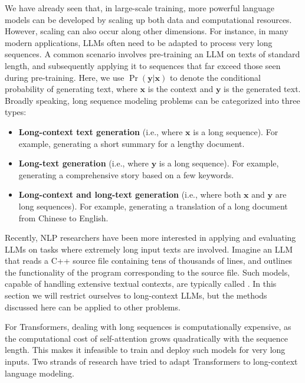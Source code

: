 \noindent We have already seen that, in large-scale training, more powerful language models can be developed by scaling up both data and computational resources. However, scaling can also occur along other dimensions. For instance, in many modern applications, LLMs often need to be adapted to process very long sequences. A common scenario involves pre-training an LLM on texts of standard length, and subsequently applying it to sequences that far exceed those seen during pre-training. Here, we use $\Pr(\mathbf{y}|\mathbf{x})$ to denote the conditional probability of generating text, where $\mathbf{x}$ is the context and $\mathbf{y}$ is the generated text. Broadly speaking, long sequence modeling problems can be categorized into three types:

\begin{itemize}
\item \vspace{0.5em} \textbf{Long-context text generation} (i.e., where $\mathbf{x}$ is a long sequence). For example, generating a short summary for a lengthy document.
\item \vspace{0.3em} \textbf{Long-text generation} (i.e., where $\mathbf{y}$ is a long sequence). For example, generating a comprehensive story based on a few keywords.
\item \vspace{0.3em} \textbf{Long-context and long-text generation} (i.e., where both $\mathbf{x}$ and $\mathbf{y}$ are long sequences). For example, generating a translation of a long document from Chinese to English.
\end{itemize}
\vspace{0.5em}

Recently, NLP researchers have been more interested in applying and evaluating LLMs on tasks where extremely long input texts are involved. Imagine an LLM that reads a C++ source file containing tens of thousands of lines, and outlines the functionality of the program corresponding to the source file. Such models, capable of handling extensive textual contexts, are typically called . In this section we will restrict ourselves to long-context LLMs, but the methods discussed here can be applied to other problems.

For Transformers, dealing with long sequences is computationally expensive, as the computational cost of self-attention grows quadratically with the sequence length. This makes it infeasible to train and deploy such models for very long inputs. Two strands of research have tried to adapt Transformers to long-context language modeling.

